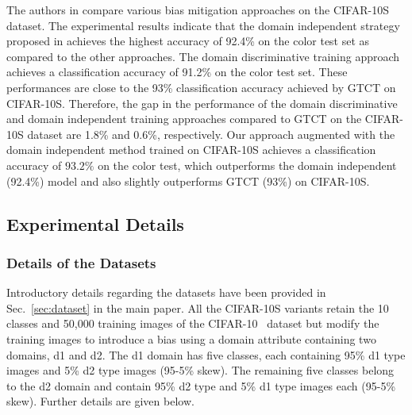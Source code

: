 \documentclass[10pt,twocolumn,letterpaper]{article}
\begin{document}
The authors in \cite{wang2020towards} compare various bias mitigation approaches on the CIFAR-10S dataset. The experimental results indicate that the domain independent strategy proposed in \cite{wang2020towards} achieves the highest accuracy of 92.4\% on the color test set as compared to the other approaches. The domain discriminative training approach achieves a classification accuracy of 91.2\% on the color test set. These performances are close to the 93\% classification accuracy achieved by GTCT on CIFAR-10S. Therefore, the gap in the performance of the domain discriminative and domain independent training approaches compared to GTCT on the CIFAR-10S dataset are 1.8\% and 0.6\%, respectively. Our approach augmented with the domain independent method trained on CIFAR-10S achieves a classification accuracy of $93.2\%$ on the color test, which outperforms the domain independent (92.4\%) model and also slightly outperforms GTCT (93\%) on CIFAR-10S. 





\subsection{Experimental Details}
\subsubsection{Details of the Datasets}
Introductory details regarding the datasets have been provided in Sec.~\ref{sec:dataset} in the main paper. All the CIFAR-10S variants retain the 10 classes and 50,000 training images of the CIFAR-10~\cite{krizhevsky2009learning} dataset but modify the training images to introduce a bias using a domain attribute containing two domains, d1 and d2. The d1 domain has five classes, each containing 95\% d1 type images and 5\% d2 type images (95-5\% skew). The remaining five classes belong to the d2 domain and contain 95\% d2 type and 5\% d1 type images each (95-5\% skew). Further details are given below.
\end{document}
